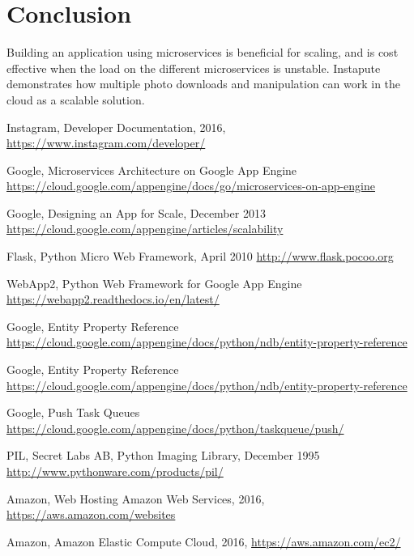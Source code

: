 \documentclass[conference]{IEEEtran}
\begin{document}
\section{Conclusion}

Building an application using microservices is beneficial for scaling, and is cost effective when the load on the different microservices is unstable. Instapute demonstrates how multiple photo downloads and manipulation can work in the cloud as a scalable solution.


\begin{thebibliography}{1}


    Instagram, Developer Documentation, 2016,
    \url{https://www.instagram.com/developer/}


    Google, Microservices Architecture on Google App Engine
    \url{https://cloud.google.com/appengine/docs/go/microservices-on-app-engine}



    Google, Designing an App for Scale, December 2013
    \url{https://cloud.google.com/appengine/articles/scalability}


    Flask, Python Micro Web Framework, April 2010
    \url{http://www.flask.pocoo.org}

    WebApp2, Python Web Framework for Google App Engine
    \url{https://webapp2.readthedocs.io/en/latest/}

    Google, Entity Property Reference
    \url{https://cloud.google.com/appengine/docs/python/ndb/entity-property-reference}

    Google, Entity Property Reference
    \url{https://cloud.google.com/appengine/docs/python/ndb/entity-property-reference}


    Google, Push Task Queues
    \url{https://cloud.google.com/appengine/docs/python/taskqueue/push/}

    PIL, Secret Labs AB, Python Imaging Library, December 1995
    \url{http://www.pythonware.com/products/pil/}



    Amazon, Web Hosting Amazon Web Services, 2016,
    \url{https://aws.amazon.com/websites}

    Amazon, Amazon Elastic Compute Cloud, 2016,
    \url{https://aws.amazon.com/ec2/}


\end{thebibliography}
\end{document}
